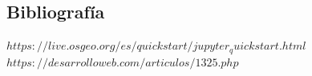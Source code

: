 \documentclass{article}
\begin{document}
\begin{doublespace}
\begin{itemize}
\section{Bibliografía}
\textit{$https://live.osgeo.org/es/quickstart/jupyter_quickstart.html$}
\\
\textit{$https://desarrolloweb.com/articulos/1325.php$}


\end{itemize}
\end{doublespace}
\end{document}
